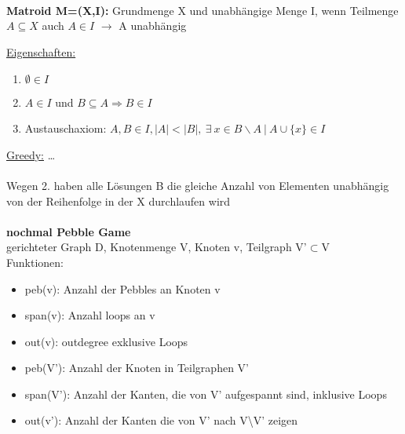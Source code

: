 \documentclass[12pt,a4paper]{article}
\begin{document}
\\\\\\
\parbox{\linewidth}{
\textbf{Matroid M=(X,I):} Grundmenge X und unabhängige Menge I, wenn Teilmenge $A\subseteq X$ auch $A \in I$ $\rightarrow$ A unabhängig

\underline{Eigenschaften:}
\begin{enumerate}
	\item $\emptyset \in I$
	\item $A \in I$ und $B \subseteq A \Rightarrow B \in I$
	\item Austauschaxiom: $A,B \in I, |A| < |B|,\ \exists\ x \in B \backslash A\ |\ A \cup \{x\} \in I$
\end{enumerate}
}
\underline{Greedy:} …
\\\\
Wegen 2. haben alle Lösungen B die gleiche Anzahl von Elementen unabhängig von der Reihenfolge in der X durchlaufen wird
\\\\
\textbf{nochmal Pebble Game}\\
gerichteter Graph D, Knotenmenge V, Knoten v, Teilgraph V'$\subset$V\\
Funktionen:
\begin{itemize}
	\item peb(v): Anzahl der Pebbles an Knoten v
	\item span(v): Anzahl loops an v
	\item out(v): outdegree exklusive Loops
	\item peb(V'): Anzahl der Knoten in Teilgraphen V'
	\item span(V'): Anzahl der Kanten, die von V' aufgespannt sind, inklusive Loops
	\item out(v'): Anzahl der Kanten die von V' nach V\textbackslash V' zeigen
\end{itemize}

\\\\
\end{document}
